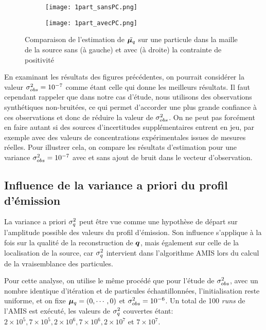 \begin{figure}[h!]
    	\centering
         	\begin{subfigure}[t]{0.5\textwidth}
         		\centering
         		\texttt{[image: 1part\_sansPC.png]}
         		\caption{}
         		\label{sansPC}
         	\end{subfigure}%
         	\begin{subfigure}[t]{0.5\textwidth}
         		\centering
         		\texttt{[image: 1part\_avecPC.png]}
         		\caption{}
         		\label{avecPC}
         	\end{subfigure}
         	\caption{Comparaison de l'estimation de $\tilde{{\bm{\mu}_q}}$ sur une particule dans la maille de la source sans (à gauche) et avec (à droite) la contrainte de positivité}
         	\label{fig_sansavecPC}
         \end{figure}

En examinant les résultats des figures précédentes, on pourrait considérer la valeur ${\sigma_{obs}^2} = 10^{-7}$ comme étant celle qui donne les meilleurs résultats. Il faut cependant rappeler que dans notre cas d'étude, nous utilisons des observations synthétiques non-bruitées, ce qui permet d'accorder une plus grande confiance à ces observations et donc de réduire la valeur de ${\sigma_{obs}^2}$. On ne peut pas forcément en faire autant si des sources d'incertitudes supplémentaires entrent en jeu, par exemple avec des valeurs de concentrations expérimentales issues de mesures réelles. Pour illustrer cela, on  compare les résultats d'estimation pour une variance ${\sigma_{obs}^2} = 10^{-7}$ avec et sans ajout de bruit dans le vecteur d'observation.\\


\subsection{Influence de la variance a priori du profil d'émission}

La variance a priori $\sigma_q^2$ peut être vue comme une hypothèse de départ sur l'amplitude possible des valeurs du profil d'émission. Son influence s'applique à la fois sur la qualité de la reconstruction de ${\bm{q}}$, mais également sur celle de la localisation de la source, car $\sigma_q^2$ intervient dans l'algorithme AMIS lors du calcul de la vraisemblance des particules. 

Pour cette analyse, on utilise le même procédé que pour l'étude de ${\sigma_{obs}^2}$, avec un nombre identique d'itération et de particules échantillonnées, l'initialisation reste uniforme, et on fixe ${\bm{\mu}_q} = (0,\cdots,0)$ et ${\sigma_{obs}^2}=10^{-6}$. Un total de 100 \textit{runs} de l'AMIS est exécuté, les valeurs de $\sigma_q^2$ couvertes étant: $2\times 10^5, 7\times 10^5, 2\times 10^6, 7\times 10^6, 2\times 10^7$ et $7\times 10^7$.\\

